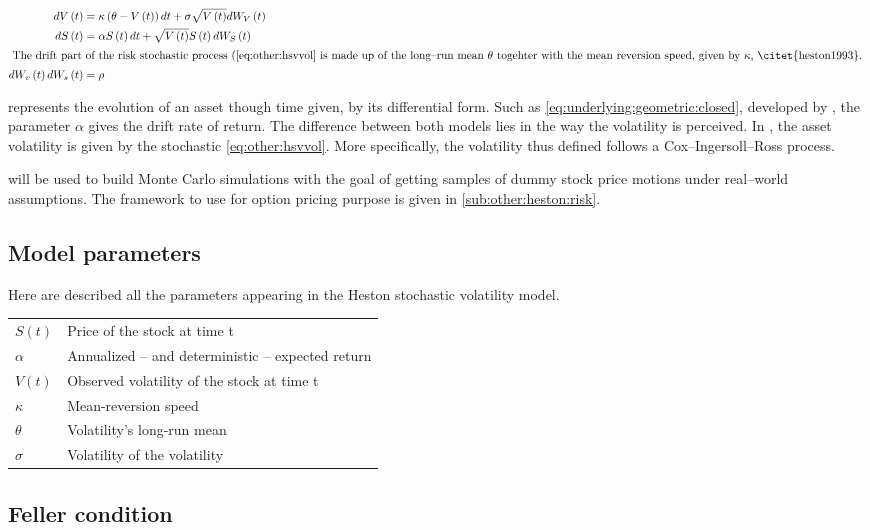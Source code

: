\documentclass[12pt]{report}
\newcommand{\Bmsub}[1]{W_{#1}\left(t\right)}
\newcommand{\St}{S\left(t\right)}
\newcommand{\Vt}{V\left(t\right)}
\newcommand{\HSVstock}{
  d\St &= \alpha \St dt + \sqrt{\Vt} \St d \Bmsub{S}
}
\newcommand{\HSVvol}{
  d\Vt &= \kappa\left(\theta - \Vt \right) dt + \sigma \sqrt{\Vt} d \Bmsub{V}
}
\begin{document}
\begin{align}
    \HSVvol \label{eq:other:hsvvol} \\
    \HSVstock \label{eq:other:hsvstock} \\
    \intertext{
    The drift part of the risk stochastic process (\ref{eq:other:hsvvol} is made up of the long--run mean $\theta$ togehter with the mean reversion speed, given by $\kappa$, \citet{heston1993}.
    }
    d\Bmsub{v} d\Bmsub{s} &= \rho \label{eq:other:rho}
\end{align}

 represents the evolution of an asset though time given, by its differential form. Such as \cref{eq:underlying:geometric:closed}, developed by \citet{bs}, the parameter $\alpha$ gives the drift rate of return. The difference between both models lies in the way the volatility is perceived. In \citet{heston1993}, the asset volatility is given by the stochastic \cref{eq:other:hsvvol}. More specifically, the volatility thus defined follows a Cox--Ingersoll--Ross process.

 will be used to build Monte Carlo simulations with the goal of getting samples of dummy stock price motions under real--world assumptions. The framework to use for option pricing purpose is given in \cref{sub:other:heston:risk}.

\subsection{Model parameters}
\label{sub:other:heston:model}

Here are described all the parameters appearing in the Heston stochastic volatility model.

\begin{tabular}{ll}
  $S(t)$ & Price of the stock at time t \\
  $\alpha$ &  Annualized -- and deterministic -- expected return \\
  $V(t)$ & Observed volatility of the stock at time t \\
  $\kappa$ & Mean-reversion speed \\
  $\theta$ & Volatility's long-run mean \\
  $\sigma$ & Volatility of the volatility 
\end{tabular}

\subsection{Feller condition}
\label{sub:other:heston:feller}
\end{document}
